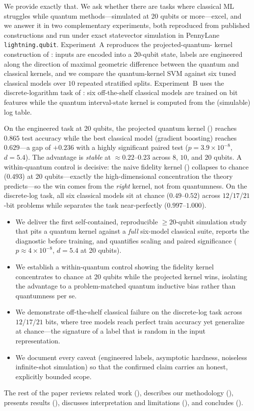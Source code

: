  We provide exactly that. We ask whether there are tasks where
classical ML struggles while quantum methods---simulated at 20 qubits or
more---excel, and we answer it in two complementary experiments, both reproduced
from published constructions and run under exact statevector simulation in
PennyLane \texttt{lightning.qubit}. Experiment~A reproduces the projected-quantum-
kernel construction of \citet{huang2021power}: inputs are encoded into a 20-qubit
state, labels are engineered along the direction of maximal geometric difference
between the quantum and classical kernels, and we compare the quantum-kernel SVM
against six tuned classical models over $10$ repeated stratified splits.
Experiment~B uses the discrete-logarithm task of \citet{liu2021rigorous}: six
off-the-shelf classical models are trained on bit features while the quantum
interval-state kernel is computed from the (simulable) log table.

 On the engineered task at 20 qubits, the projected
quantum kernel (\pqk) reaches $0.865$ test accuracy while the best classical
model (gradient boosting) reaches $0.629$---a gap of $+0.236$ with a highly
significant paired test ($p=3.9\times10^{-8}$, $d=5.4$). The advantage is
\emph{stable} at $\approx0.22$--$0.23$ across $8$, $10$, and $20$ qubits. A
within-quantum control is decisive: the naive fidelity kernel (\fqk) collapses to
chance ($0.493$) at 20 qubits---exactly the high-dimensional concentration the
theory predicts---so the win comes from the \emph{right} kernel, not from
quantumness. On the discrete-log task, all six classical models sit at chance
($0.49$--$0.52$) across $12$/$17$/$21$-bit problems while \isk{} separates the
task near-perfectly ($0.997$--$1.000$).

\begin{itemize}[leftmargin=*,itemsep=0pt,topsep=0pt]
    \item We deliver the first self-contained, reproducible $\ge 20$-qubit
    simulation study that pits a quantum kernel against a \emph{full} six-model
    classical suite, reports the \gdiff{} diagnostic before training, and
    quantifies scaling and paired significance ($p\approx 4\times10^{-8}$,
    $d=5.4$ at 20 qubits).
    \item We establish a within-quantum control showing the fidelity kernel
    concentrates to chance at 20 qubits while the projected kernel wins,
    isolating the advantage to a problem-matched quantum inductive bias rather
    than quantumness per se.
    \item We demonstrate off-the-shelf classical failure on the discrete-log task
    across $12$/$17$/$21$ bits, where tree models reach perfect train accuracy yet
    generalize at chance---the signature of a label that is random in the input
    representation.
    \item We document every caveat (engineered labels, asymptotic hardness,
    noiseless infinite-shot simulation) so that the confirmed claim carries an
    honest, explicitly bounded scope.
\end{itemize}

The rest of the paper reviews related work (), describes our
methodology (), presents results (),
discusses interpretation and limitations (), and concludes
().
